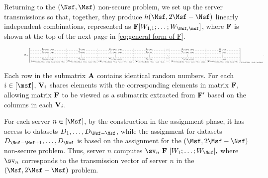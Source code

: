 \documentclass[conference,letterpaper]{IEEEtran}
\begin{document}
Returning to the \( (\Nsf, \Msf) \) non-secure problem, we set up the server transmissions so that, together, they produce \( h(\Msf, 2\Msf - \Nsf) \) linearly independent combinations, represented as \( {\bf F} [W_{1,1}; \ldots; W_{\Nsf, \msf}] \), where \( {\bf F} \) is shown at the top of the next page in \eqref{eq:general form of F}.
\begin{figure*}[ht]
\begin{equation}
\resizebox{\textwidth}{!}{$ %
{\bf F} = 
\left[
\begin{array}{c:c:c:c:c:c:c}
{\bf 1}_{1 \times (\Nsf - \Msf)} & {\bf 1}_{1 \times \Msf} & {\bf 0}_{1 \times (\Nsf - \Msf)} & {\bf 0}_{1 \times \Msf} & \cdots & {\bf 0}_{1 \times (\Nsf - \Msf)} & {\bf 0}_{1 \times \Msf} \\ \hdashline
{\bf 0}_{1 \times (\Nsf - \Msf)} & {\bf 0}_{1 \times \Msf} & {\bf 1}_{1 \times (\Nsf - \Msf)} & {\bf 1}_{1 \times \Msf} & \cdots & {\bf 0}_{1 \times (\Nsf - \Msf)} & {\bf 0}_{1 \times \Msf} \\ \hdashline 
\vdots & \vdots & \vdots & \vdots & \ddots & \vdots & \vdots \\ \hdashline
{\bf 0}_{1 \times (\Nsf - \Msf)} & {\bf 0}_{1 \times \Msf} & {\bf 0}_{1 \times (\Nsf - \Msf)} & {\bf 0}_{1 \times \Msf} & \cdots & {\bf 1}_{1 \times (\Nsf - \Msf)} & {\bf 1}_{1 \times \Msf} \\ \hdashline
({\bf A})_{(h(\Msf, 2\Msf-\Nsf) - \msf) \times (\Nsf - \Msf)} & ({\bf V}_{1})_{(h(\Msf, 2\Msf-\Nsf) - \msf) \times \Msf} & ({\bf A})_{(h(\Msf, 2\Msf-\Nsf) - \msf) \times (\Nsf - \Msf)} & ({\bf V}_{2})_{(h(\Msf, 2\Msf-\Nsf) - \msf) \times \Msf} & \cdots & ({\bf A})_{(h(\Msf, 2\Msf-\Nsf) - \msf) \times (\Nsf - \Msf)} & ({\bf V}_{\msf})_{(h(\Msf, 2\Msf-\Nsf) - \msf) \times \Msf}
\end{array}
\right]_{h(\Msf, 2\Msf - \Nsf) \times \msf \Nsf}.$}
\label{eq:general form of F}
\end{equation}

\end{figure*}
Each row in the submatrix ${\bf A}$ contains identical random numbers. For each $i \in [\msf]$, ${\bf V}_i$ shares elements with the corresponding elements in matrix ${\bf F}$, allowing matrix ${\bf F}$ to be viewed as a submatrix extracted from ${\bf F}'$ based on the columns in each ${\bf V}_i$.

For each server $n \in [\Msf]$, by the construction in the assignment phase, it has access to datasets $D_1, \ldots, D_{\Nsf - \Msf}$, while the assignment for datasets $D_{\Nsf - \Msf + 1}, \ldots, D_{\Nsf}$ is based on the assignment for the $(\Msf, 2\Msf - \Nsf)$ non-secure problem. Thus, server $n$ computes
$ 
\sv_{n} \ {\bf F} \ [W_1; \ldots; W_{\Nsf}],
$
where $\sv_n$ corresponds to the transmission vector of server $n$ in the $(\Msf, 2\Msf - \Nsf)$ problem.
\end{document}
